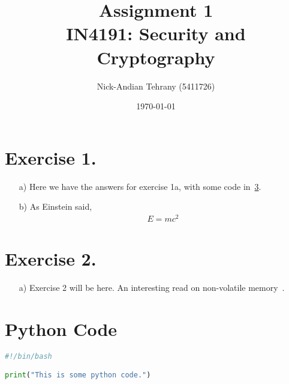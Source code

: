 \documentclass{article}
\title{Assignment 1 \\IN4191: Security and Cryptography}
\author{Nick-Andian Tehrany (5411726)}
\date{\today}
\begin{document}
\maketitle

\section{Exercise 1.}
\begin{enumerate}
    \item [a)] Here we have the answers for exercise 1a, with some code in~\ref{appendix:python_code}.

    \item [b)] As Einstein said,
          \begin{equation*}
              \begin{split}
                  E = mc^2
              \end{split}
          \end{equation*}
\end{enumerate}

\section{Exercise 2.}
\begin{enumerate}
    \item [a)]  Exercise 2 will be here. An interesting read on non-volatile memory~\cite{inproceedings:pmemguide}.
\end{enumerate}




\appendix
\section{Python Code}
\label{appendix:python_code}
\begin{lstlisting}[language=Python, caption={\raggedright Some python Code.}]
#!/bin/bash

print("This is some python code.")
\end{lstlisting}
\end{document}
